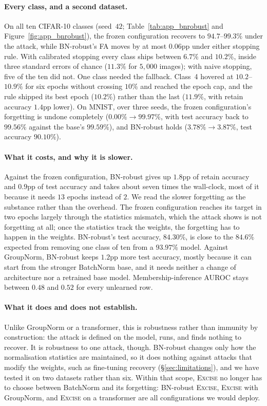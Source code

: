 \documentclass{article}
\newcommand{\ours}{\textsc{Excise}}
\theoremstyle{remark}
\theoremstyle{plain}
\begin{document}
\paragraph{Every class, and a second dataset.}
On all ten CIFAR-10 classes (seed~$42$; Table~\ref{tab:app_bnrobust} and
Figure~\ref{fig:app_bnrobust}), the
frozen configuration recovers to $94.7$--$99.3\%$ under the attack, while
BN-robust's FA moves by at most $0.06$pp under either stopping rule. With
calibrated stopping every class ships between $6.7\%$ and $10.2\%$, inside three
standard errors of chance ($11.3\%$ for $5{,}000$ images); with naive stopping,
five of the ten did not. One class needed the fallback. Class~4 hovered at
$10.2$--$10.9\%$ for six epochs without crossing $10\%$ and reached the epoch
cap, and the rule shipped its best epoch ($10.2\%$) rather than the last
($11.9\%$, with retain accuracy $1.4$pp lower). On MNIST, over three seeds, the
frozen configuration's forgetting is undone completely ($0.00\% \to 99.97\%$,
with test accuracy back to $99.56\%$ against the base's $99.59\%$), and
BN-robust holds ($3.78\% \to 3.87\%$, test accuracy $90.10\%$).

\paragraph{What it costs, and why it is slower.}
Against the frozen configuration, BN-robust gives up $1.8$pp of retain accuracy
and $0.9$pp of test accuracy and takes about seven times the wall-clock, most of
it because it needs $13$ epochs instead of $2$. We read the slower forgetting as
the substance rather than the overhead. The frozen configuration reaches its
target in two epochs largely through the statistics mismatch, which the attack
shows is not forgetting at all; once the statistics track the weights, the
forgetting has to happen in the weights. BN-robust's test accuracy, $84.30\%$,
is close to the $84.6\%$ expected from removing one class of ten from a
$93.97\%$ model. Against GroupNorm, BN-robust keeps $1.2$pp more test accuracy,
mostly because it can start from the stronger BatchNorm base, and it needs
neither a change of architecture nor a retrained base model.
Membership-inference AUROC stays between $0.48$ and $0.52$ for every unlearned
row.

\paragraph{What it does and does not establish.}
Unlike GroupNorm or a transformer, this is robustness rather than immunity by
construction: the attack is defined on the model, runs, and finds nothing to
recover. It is robustness to one attack, though. BN-robust changes only how the
normalisation statistics are maintained, so it does nothing against attacks that
modify the weights, such as fine-tuning recovery (\S\ref{sec:limitations}), and
we have tested it on two datasets rather than six. Within that scope, \ours{} no
longer has to choose between BatchNorm and its forgetting: BN-robust \ours{},
\ours{} with GroupNorm, and \ours{} on a transformer are all configurations we
would deploy.
\endgroup%
\end{document}
